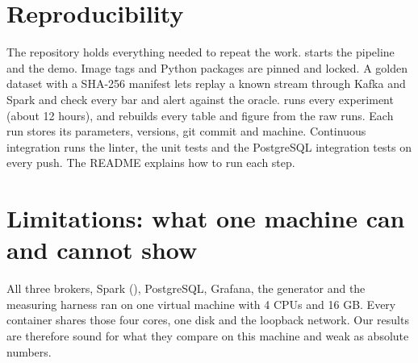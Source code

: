 \section{Reproducibility}
\label{sec:repro}
The repository holds everything needed to repeat the work.  starts the pipeline
and the demo. Image tags and Python packages are pinned and locked. A golden dataset with a SHA-256
manifest lets  replay a known stream through Kafka and Spark and check every bar and
alert against the oracle.  runs every experiment (about 12 hours), and
 rebuilds every table and figure from the raw runs. Each run stores
its parameters, versions, git commit and machine. Continuous integration runs the linter, the unit tests and
the PostgreSQL integration tests on every push. The README explains how to run each step.

\section{Limitations: what one machine can and cannot show}
\label{sec:limits}
All three brokers, Spark (), PostgreSQL, Grafana, the generator and the measuring harness
ran on one virtual machine with 4 CPUs and 16 GB. Every container shares those four cores, one disk and
the loopback network. Our results are therefore sound for what they compare on this machine and weak as
absolute numbers.

